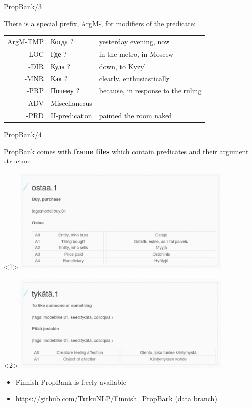 \documentclass[10pt, compress]{beamer}
\begin{document}
\begin{frame}{PropBank/3}

There is a special prefix, ArgM-, for modifiers of the predicate:

\begin{center}
\begin{tabular}{rll}
ArgM-TMP & Когда ? & yesterday evening, now \\
-LOC & Где ? & in the metro, in Moscow \\
-DIR & Куда ? & down, to Kyzyl \\
-MNR & Как ? & clearly, enthusiastically \\
-PRP & Почему ? & because, in response to the ruling \\
-ADV & Miscellaneous & -- \\
-PRD & II-predication & painted the room naked \\
\end{tabular}
\end{center}


\end{frame}

\begin{frame}{PropBank/4}

PropBank comes with \textbf{frame files} which contain predicates and their argument structure.

\begin{center}
\begin{onlyenv}<1>
\includegraphics[width=0.8\textwidth]{graphics/finn-propbank.png}
\end{onlyenv}
\begin{onlyenv}<2>
\includegraphics[width=0.8\textwidth]{graphics/finn-propbank2.png}
\end{onlyenv}
\end{center}

\begin{itemize}
  \item Finnish PropBank is freely available
  \item \url{https://github.com/TurkuNLP/Finnish_PropBank} (data branch)
\end{itemize}
  
\end{frame}
\end{document}
